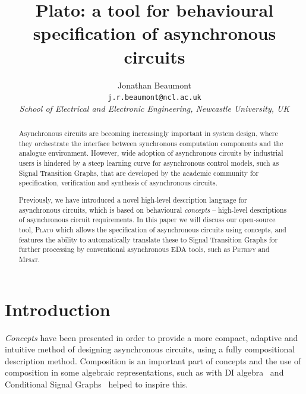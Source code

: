 \documentclass[british,conference,compsoc]{IEEEtran}
\newcommand{\noun}[1]{\textsc{#1}}
\begin{document}
\twocolumn

\title{Plato: a tool for behavioural 
\\ specification of asynchronous circuits}
\author{Jonathan Beaumont\\
\texttt{j.r.beaumont@ncl.ac.uk}\\
\emph{School of Electrical and Electronic Engineering, Newcastle University,
UK}}

\maketitle

\begin{abstract}
Asynchronous circuits are becoming increasingly important in
system design, where they orchestrate
the interface between synchronous computation components
and the analogue environment.
However, wide adoption of asynchronous circuits by industrial users is
hindered by a steep learning curve for asynchronous control models,
such as Signal Transition Graphs, that are developed by the academic
community for specification, verification and synthesis of
asynchronous circuits.

Previously, we have introduced a novel high-level description language
for asynchronous circuits, which is based on behavioural
\textit{concepts} -- high-level descriptions of asynchronous circuit
requirements.
In this paper we will discuss our open-source tool, \noun{Plato} 
which allows the specification of asynchronous circuits using concepts, and 
features the ability to automatically translate these to Signal Transition 
Graphs for further processing by conventional asynchronous EDA 
tools, such as \noun{Petrify} and \noun{Mpsat}.
\end{abstract}

\sloppy
\thispagestyle{empty}

\vspace{-3mm}

\section{Introduction}

\vspace{-3mm}

\emph{Concepts} have been presented in order to provide a more compact, 
adaptive and intuitive method of designing asynchronous circuits, using a fully
compositional description method. Composition is an 
important part of concepts and the use of composition in some algebraic 
representations, such as with DI algebra~\cite{270632} and Conditional Signal 
Graphs~\cite{6243877} helped to inspire this. 
\end{document}
